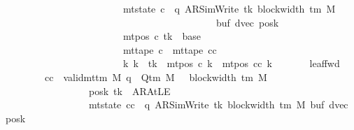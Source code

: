 \begin{isabellebody}
\ \ \ \ \ \ \ \ \ \ \ \ \ \ \ \ \ \ \ \ \ \ \ {\isasymand}\ mt{\isacharunderscore}{\kern0pt}state\ c{}\ {\isacharequal}{\kern0pt}\ {\isacharparenleft}{\kern0pt}q{\isacharcomma}{\kern0pt}\ AR{\isacharunderscore}{\kern0pt}SimWrite{\isacharcomma}{\kern0pt}\ tk{\isacharcomma}{\kern0pt}\ block{\isacharunderscore}{\kern0pt}width\ {\isacharparenleft}{\kern0pt}{\isasymGamma}{\isacharunderscore}{\kern0pt}tm\ M{\isacharparenright}{\kern0pt}{\isacharcomma}{\kern0pt}\isanewline
\ \ \ \ \ \ \ \ \ \ \ \ \ \ \ \ \ \ \ \ \ \ \ \ \ \ \ \ \ \ \ \ \ \ \ \ \ \ \ \ \ \ \ buf{\isacharcomma}{\kern0pt}\ dvec{\isacharcomma}{\kern0pt}\ posk{\isacharparenright}{\kern0pt}\isanewline
\ \ \ \ \ \ \ \ \ \ \ \ \ \ \ \ \ \ \ \ \ \ \ {\isasymand}\ mt{\isacharunderscore}{\kern0pt}pos\ c{}\ tk\ {\isacharequal}{\kern0pt}\ base\isanewline
\ \ \ \ \ \ \ \ \ \ \ \ \ \ \ \ \ \ \ \ \ \ \ {\isasymand}\ mt{\isacharunderscore}{\kern0pt}tape\ c{}\ {\isacharequal}{\kern0pt}\ mt{\isacharunderscore}{\kern0pt}tape\ cc\isanewline
\ \ \ \ \ \ \ \ \ \ \ \ \ \ \ \ \ \ \ \ \ \ \ {\isasymand}\ {\isacharparenleft}{\kern0pt}{\isasymforall}k{\isacharprime}{\kern0pt}{\isachardot}{\kern0pt}\ k{\isacharprime}{\kern0pt}\ {\isasymnoteq}\ tk\ {\isasymlongrightarrow}\ mt{\isacharunderscore}{\kern0pt}pos\ c{}\ k{\isacharprime}{\kern0pt}\ {\isacharequal}{\kern0pt}\ mt{\isacharunderscore}{\kern0pt}pos\ cc\ k{\isacharprime}{\kern0pt}{\isacharparenright}{\kern0pt}{\isachardoublequoteclose}\isanewline
\ \ \ \ \ \ \ leaf{\isacharunderscore}{\kern0pt}fwd{\isacharcolon}{\kern0pt}\isanewline
\ \ \ \ \ \ \ \ {\isachardoublequoteopen}{\isasymAnd}cc{\isachardot}{\kern0pt}\ {\isasymlbrakk}\ valid{\isacharunderscore}{\kern0pt}mttm\ M{\isacharsemicolon}{\kern0pt}\ q\ {\isasymin}\ Q{\isacharunderscore}{\kern0pt}tm\ M{\isacharsemicolon}{\kern0pt}\ {}\ {\isasymle}\ block{\isacharunderscore}{\kern0pt}width\ {\isacharparenleft}{\kern0pt}{\isasymGamma}{\isacharunderscore}{\kern0pt}tm\ M{\isacharparenright}{\kern0pt}{\isacharsemicolon}{\kern0pt}\isanewline
\ \ \ \ \ \ \ \ \ \ \ \ \ \ \ \ \ posk\ tk\ {\isasymnoteq}\ AR{\isacharunderscore}{\kern0pt}AtLE{\isacharsemicolon}{\kern0pt}\isanewline
\ \ \ \ \ \ \ \ \ \ \ \ \ \ \ \ \ mt{\isacharunderscore}{\kern0pt}state\ cc\ {\isacharequal}{\kern0pt}\ {\isacharparenleft}{\kern0pt}q{\isacharcomma}{\kern0pt}\ AR{\isacharunderscore}{\kern0pt}SimWrite{\isacharcomma}{\kern0pt}\ tk{\isacharcomma}{\kern0pt}\ block{\isacharunderscore}{\kern0pt}width\ {\isacharparenleft}{\kern0pt}{\isasymGamma}{\isacharunderscore}{\kern0pt}tm\ M{\isacharparenright}{\kern0pt}{\isacharcomma}{\kern0pt}\ buf{\isacharcomma}{\kern0pt}\ dvec{\isacharcomma}{\kern0pt}\ posk{\isacharparenright}{\kern0pt}{\isacharsemicolon}{\kern0pt}\isanewline

\end{isabellebody}

